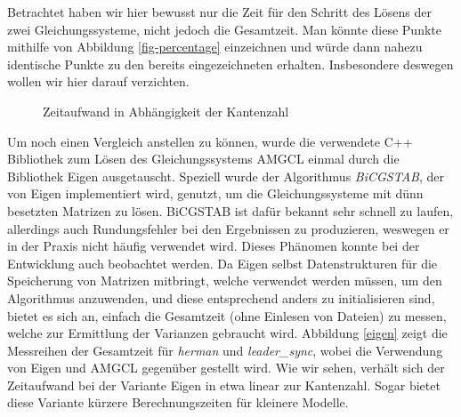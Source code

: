 \documentclass[a4paper]{article}
\theoremstyle{nonumberplain}
\begin{document}
Betrachtet haben wir hier bewusst nur die Zeit für den Schritt des Lösens der zwei Gleichungssysteme, nicht jedoch die Gesamtzeit. Man könnte diese Punkte mithilfe von Abbildung \ref{fig-percentage} einzeichnen und würde dann nahezu identische Punkte zu den bereits eingezeichneten erhalten. Insbesondere deswegen wollen wir hier darauf verzichten.


\begin{figure}
	\caption{Zeitaufwand in Abhängigkeit der Kantenzahl}
	\label{fig-in-edges1}
	\centering
\end{figure}

Um noch einen Vergleich anstellen zu können, wurde die verwendete C++ Bibliothek zum Lösen des Gleichungssystems AMGCL einmal durch die Bibliothek Eigen ausgetauscht. Speziell wurde der Algorithmus \textit{BiCGSTAB}, der von Eigen implementiert wird, genutzt, um die Gleichungssysteme mit dünn besetzten Matrizen zu lösen. BiCGSTAB ist dafür bekannt sehr schnell zu laufen, allerdings auch Rundungsfehler bei den Ergebnissen zu produzieren, weswegen er in der Praxis nicht häufig verwendet wird. Dieses Phänomen konnte bei der Entwicklung auch beobachtet werden. Da Eigen selbst Datenstrukturen für die Speicherung von Matrizen mitbringt, welche verwendet werden müssen, um den Algorithmus anzuwenden, und diese entsprechend anders zu initialisieren sind, bietet es sich an, einfach die Gesamtzeit (ohne Einlesen von Dateien) zu messen, welche zur Ermittlung der Varianzen gebraucht wird. Abbildung \ref{eigen} zeigt die Messreihen der Gesamtzeit für \textit{herman} und \textit{leader\_sync}, wobei die Verwendung von Eigen und AMGCL gegenüber gestellt wird. Wie wir sehen, verhält sich der Zeitaufwand bei der Variante Eigen in etwa linear zur Kantenzahl. Sogar bietet diese Variante kürzere Berechnungszeiten für kleinere Modelle.
\end{document}
